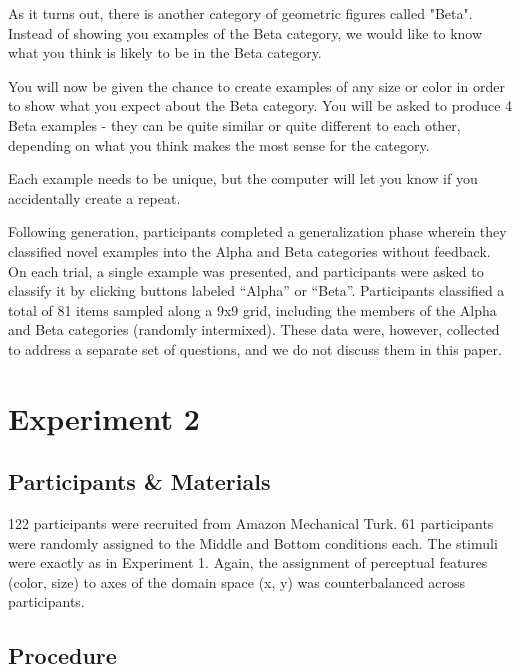 \documentclass[12pt]{article}
\begin{document}
\begin{flushleft}
\begin{displayquote}
As it turns out, there is another category of geometric figures called "Beta". Instead of showing you examples of the Beta category, we would like to know what you think is likely to be in the Beta category. 

You will now be given the chance to create examples of any size or color in order to show what you expect about the Beta category. You will be asked to produce 4 Beta examples - they can be quite similar or quite different to each other, depending on what you think makes the most sense for the category.

Each example needs to be unique, but the computer will let you know if you accidentally create a repeat.
\end{displayquote}

Following generation, participants completed a generalization phase wherein they classified novel examples into the Alpha and Beta categories without feedback. On each trial, a single example was presented, and participants were asked to classify it by clicking buttons labeled ``Alpha'' or ``Beta''. Participants classified a total of 81 items sampled along a 9x9 grid, including the members of the Alpha and Beta categories (randomly intermixed). These data were, however, collected to address a separate set of questions, and we do not discuss them in this paper.




\clearpage

\section{Experiment 2}


\subsection{Participants \& Materials}

122 participants were recruited from Amazon Mechanical Turk. 61 participants were randomly assigned to the Middle and Bottom conditions each. The stimuli were exactly as in Experiment 1. Again, the assignment of perceptual features (color, size) to axes of the domain space (x, y) was counterbalanced across participants.

\subsection{Procedure}


\end{flushleft}
\end{document}
